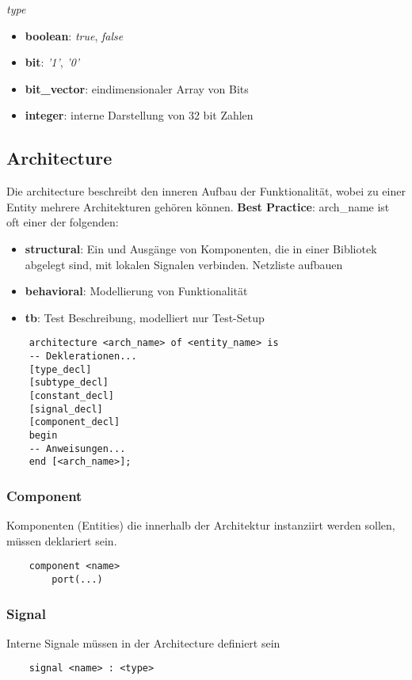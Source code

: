 \noindent\textit{type}
\begin{itemize}[nosep]
	\item \textbf{boolean}: \textit{true}, \textit{false}
	\item \textbf{bit}: \textit{'1'}, \textit{'0'}
	\item \textbf{bit\_vector}: eindimensionaler Array von Bits
	\item \textbf{integer}: interne Darstellung von 32 bit Zahlen
\end{itemize}

\subsection{Architecture}
Die architecture beschreibt den inneren Aufbau der Funktionalität, wobei zu einer Entity mehrere Architekturen gehören können. \textbf{Best Practice}: arch\_name ist oft einer der folgenden:
\begin{itemize}[nosep]
	\item \textbf{structural}: Ein und Ausgänge von Komponenten, die in einer Bibliotek abgelegt sind, mit lokalen Signalen verbinden. Netzliste aufbauen
	\item \textbf{behavioral}: Modellierung von Funktionalität
	\item \textbf{tb}: Test Beschreibung, modelliert nur Test-Setup
\end{itemize}

\begin{lstlisting}
	architecture <arch_name> of <entity_name> is
	-- Deklerationen...
	[type_decl]
	[subtype_decl]
	[constant_decl]
	[signal_decl]
	[component_decl]
	begin
	-- Anweisungen...
	end [<arch_name>];
\end{lstlisting}

\subsubsection{Component}
Komponenten (Entities) die innerhalb der Architektur instanziirt werden sollen, müssen deklariert sein.
\begin{lstlisting}
	component <name>
		port(...)
\end{lstlisting}

\subsubsection{Signal}
Interne Signale müssen in der Architecture definiert sein
\begin{lstlisting}
	signal <name> : <type>
\end{lstlisting}

